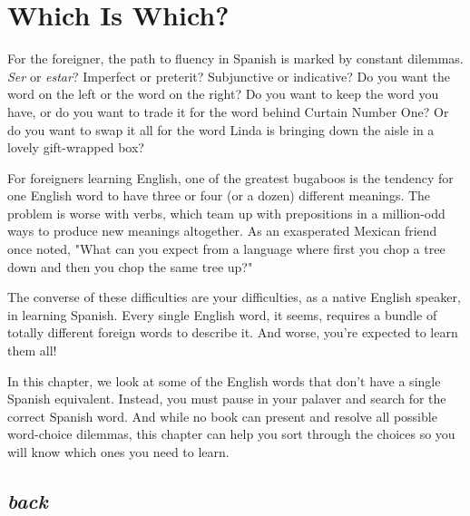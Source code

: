 \chapter{Which Is Which?}

For the foreigner, the path to fluency in Spanish is marked by
constant dilemmas. \emph{Ser} or \emph{estar}? Imperfect or preterit? Subjunctive
or indicative? Do you want the word on the left or the word on the
right? Do you want to keep the word you have, or do you want to trade
it for the word behind Curtain Number One? Or do you want to swap
it all for the word Linda is bringing down the aisle in a lovely gift-wrapped box?

For foreigners learning English, one of the greatest bugaboos
is the tendency for one English word to have three or four (or a dozen)
different meanings. The problem is worse with verbs, which team up
with prepositions in a million-odd ways to produce new meanings altogether. As an exasperated Mexican friend once noted, "What can you
expect from a language where first you chop a tree down and then you
chop the same tree up?"

The converse of these difficulties are your difficulties, as a native English speaker, in learning Spanish. Every single English word, it
seems, requires a bundle of totally different foreign words to describe
it. And worse, you're expected to learn them all!

In this chapter, we look at some of the English words that
don't have a single Spanish equivalent. Instead, you must pause in your
palaver and search for the correct Spanish word. And while no book
can present and resolve all possible word-choice dilemmas, this chapter can help you sort through the choices so you will know which ones
you need to learn.

\section{\emph{back}}


